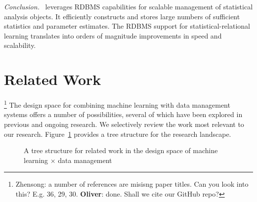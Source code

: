 {\em Conclusion.} \FB\ leverages RDBMS capabilities for scalable management of statistical analysis objects. It efficiently constructs and stores large numbers of sufficient statistics and parameter estimates. 
The RDBMS support for statistical-relational learning translates into orders of magnitude improvements in speed and scalability.


\section{Related Work} \label{sec:related}

\footnote{Zhensong: a number of references are misisng paper titles. Can you look into this? E.g. 36, 29, 30. \textbf{Oliver}: done. Shall we cite our GitHub repo?} The design space for combining machine learning with data management systems offers a number of possibilities, several of which have been explored in previous and ongoing research. 
We selectively review the work most relevant to our research. Figure~\ref{fig:related} provides a tree structure for the research landscape. 

\begin{figure}[htbp] %
 \centering
{}
\caption{A tree structure for related work in the design space of machine learning $\times$ data management}
\label{fig:related}
\end{figure}


